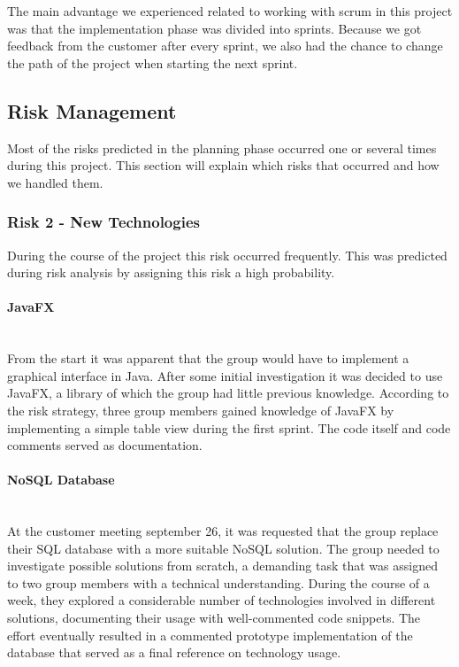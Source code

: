 \documentclass[../document]{subfiles}
\begin{document}
The main advantage we experienced related to working with scrum in this project was that the implementation phase was divided into sprints. Because we got feedback from the customer after every sprint, we also had the chance to change the path of the project when starting the next sprint.  

\subsection{Risk Management}
Most of the risks predicted in the planning phase occurred one or several times during this project. This section will explain which risks that occurred and how we handled them. 

\subsubsection{Risk 2 - New Technologies}
During the course of the project this risk occurred frequently. This was predicted during risk analysis by assigning this risk a high probability. 

\paragraph{JavaFX} \ \\
From the start it was apparent that the group would have to implement a graphical interface in Java. After some initial investigation it was decided to use JavaFX, a library of which the group had little previous knowledge. According to the risk strategy, three group members gained knowledge of JavaFX by implementing a simple table view during the first sprint. The code itself and code comments served as documentation. 

\paragraph{NoSQL Database} \ \\
At the customer meeting september 26, it was requested that the group replace their SQL database with a more suitable NoSQL solution. The group needed to investigate possible solutions from scratch, a demanding task that was assigned to two group members with a technical understanding. During the course of a week, they explored a considerable number of technologies involved in different solutions, documenting their usage with well-commented code snippets. The effort eventually resulted in a commented prototype implementation of the database that served as a final reference on technology usage.
\end{document}
